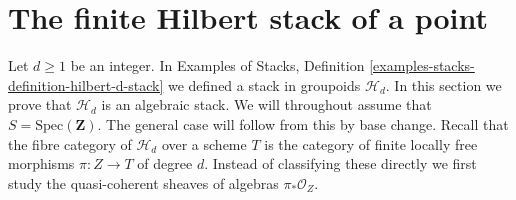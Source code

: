 









\section{The finite Hilbert stack of a point}
\label{section-hilbert-point}

\noindent
Let $d \geq 1$ be an integer. In
Examples of Stacks, Definition \ref{examples-stacks-definition-hilbert-d-stack}
we defined a stack in groupoids $\mathcal{H}_d$.
In this section we prove that $\mathcal{H}_d$ is an
algebraic stack. We will throughout assume that
$S = \text{Spec}(\mathbf{Z})$.
The general case will follow from this by base change.
Recall that the fibre category of $\mathcal{H}_d$ over a scheme $T$
is the category of finite locally free morphisms $\pi : Z \to T$ of
degree $d$. Instead of classifying these directly we first
study the quasi-coherent sheaves of algebras $\pi_*\mathcal{O}_Z$.

